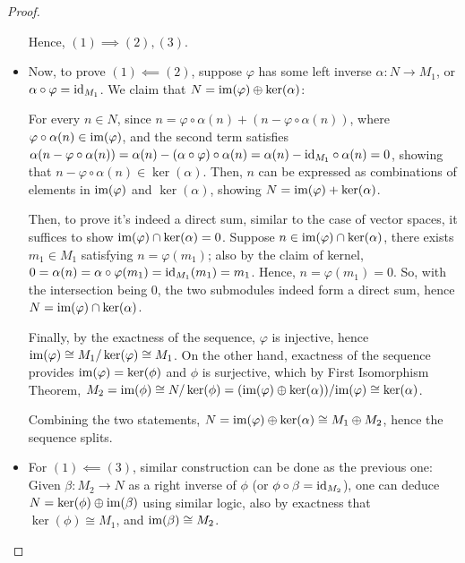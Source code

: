 \documentclass[x11names,reqno,12pt]{extarticle}
\newcommand{\id}{\textmd{id}}
\begin{document}
\begin{proof}
\begin{itemize}
        Hence, $(1)\implies (2),(3)$.

        \item Now, to prove $(1)\impliedby (2)$, suppose $\varphi$ has some left inverse $\alpha:N\rightarrow M_1$, or $\alpha\circ \varphi = \id_{M_1}$. We claim that $N = \textmd{im}(\varphi)\oplus \ker(\alpha)$: 

        For every $n \in N$, since $n = \varphi\circ \alpha(n) + (n-\varphi\circ\alpha(n))$, where $\varphi\circ \alpha(n)\in \textmd{im}(\varphi)$, and the second term satisfies $\alpha(n-\varphi\circ\alpha(n)) = \alpha(n) - (\alpha\circ\varphi)\circ\alpha(n) = \alpha(n)-\id_{M_1}\circ \alpha(n) = 0$, showing that $n-\varphi\circ\alpha(n)\in \ker(\alpha)$. Then, $n$ can be expressed as combinations of elements in $\textmd{im}(\varphi)$ and $\ker(\alpha)$, showing $N=\textmd{im}(\varphi)+\ker(\alpha)$.

        Then, to prove it's indeed a direct sum, similar to the case of vector spaces, it suffices to show $\textmd{im}(\varphi)\cap \ker(\alpha)=0$. Suppose $n\in \textmd{im}(\varphi)\cap \ker(\alpha)$, there exists $m_1 \in M_1$ satisfying $n = \varphi(m_1)$; also by the claim of kernel, $0=\alpha(n) = \alpha\circ\varphi(m_1) = \id_{M_1}(m_1)=m_1$. Hence, $n = \varphi(m_1) = 0$. So, with the intersection being $0$, the two submodules indeed form a direct sum, hence $N=\textmd{im}(\varphi)\cap \ker(\alpha)$.

        \hfill

        Finally, by the exactness of the sequence, $\varphi$ is injective, hence $\textmd{im}(\varphi)\cong M_1/\ker(\varphi) \cong M_1$. On the other hand, exactness of the sequence provides $\textmd{im}(\varphi)=\ker(\phi)$ and $\phi$ is surjective, which by First Isomorphism Theorem, $M_2 = \textmd{im}(\phi) \cong N/\ker(\phi) = (\textmd{im}(\varphi)\oplus \ker(\alpha)) / \textmd{im}(\varphi) \cong \ker(\alpha)$.

        Combining the two statements, $N = \textmd{im}(\varphi)\oplus \ker(\alpha) \cong M_1\oplus M_2$, hence the sequence splits.

        \item For $(1)\impliedby (3)$, similar construction can be done as the previous one: Given $\beta:M_2\rightarrow N$ as a right inverse of $\phi$ (or $\phi\circ \beta = \id_{M_2}$), one can deduce $N = \ker(\phi)\oplus \textmd{im}(\beta)$ using similar logic, also by exactness that $\ker(\phi)\cong M_1$, and $\textmd{im}(\beta)\cong M_2$.
    \end{itemize}
\end{proof}
\end{document}
